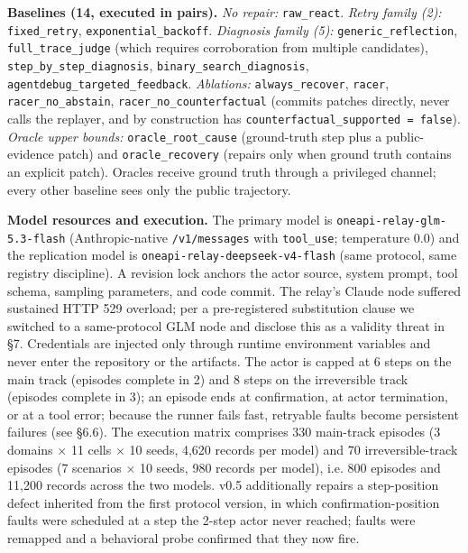 \documentclass[review]{fcs}
\begin{document}
\textbf{Baselines (14, executed in pairs).} \emph{No repair:} \texttt{raw\_react}. \emph{Retry family (2):} \texttt{fixed\_retry}, \texttt{exponential\_backoff}. \emph{Diagnosis family (5):} \texttt{generic\_reflection}, \texttt{full\_trace\_judge} (which requires corroboration from multiple candidates), \texttt{step\_by\_step\_diagnosis}, \texttt{binary\_search\_diagnosis}, \texttt{agentdebug\_targeted\_feedback}. \emph{Ablations:} \texttt{always\_recover}, \texttt{racer}, \texttt{racer\_no\_abstain}, \texttt{racer\_no\_counterfactual} (commits patches directly, never calls the replayer, and by construction has \texttt{counterfactual\_supported = false}). \emph{Oracle upper bounds:} \texttt{oracle\_root\_cause} (ground-truth step plus a public-evidence patch) and \texttt{oracle\_recovery} (repairs only when ground truth contains an explicit patch). Oracles receive ground truth through a privileged channel; every other baseline sees only the public trajectory.

\textbf{Model resources and execution.} The primary model is \texttt{oneapi-relay-glm-5.3-flash} (Anthropic-native \texttt{/v1/messages} with \texttt{tool\_use}; temperature 0.0) and the replication model is \texttt{oneapi-relay-deepseek-v4-flash} (same protocol, same registry discipline). A revision lock anchors the actor source, system prompt, tool schema, sampling parameters, and code commit. The relay's Claude node suffered sustained HTTP 529 overload; per a pre-registered substitution clause we switched to a same-protocol GLM node and disclose this as a validity threat in \S7. Credentials are injected only through runtime environment variables and never enter the repository or the artifacts. The actor is capped at 6 steps on the main track (episodes complete in 2) and 8 steps on the irreversible track (episodes complete in 3); an episode ends at confirmation, at actor termination, or at a tool error; because the runner fails fast, retryable faults become persistent failures (see \S6.6). The execution matrix comprises 330 main-track episodes (3 domains $\times$ 11 cells $\times$ 10 seeds, 4,620 records per model) and 70 irreversible-track episodes (7 scenarios $\times$ 10 seeds, 980 records per model), i.e. 800 episodes and 11,200 records across the two models. v0.5 additionally repairs a step-position defect inherited from the first protocol version, in which confirmation-position faults were scheduled at a step the 2-step actor never reached; faults were remapped and a behavioral probe confirmed that they now fire.
\end{document}
